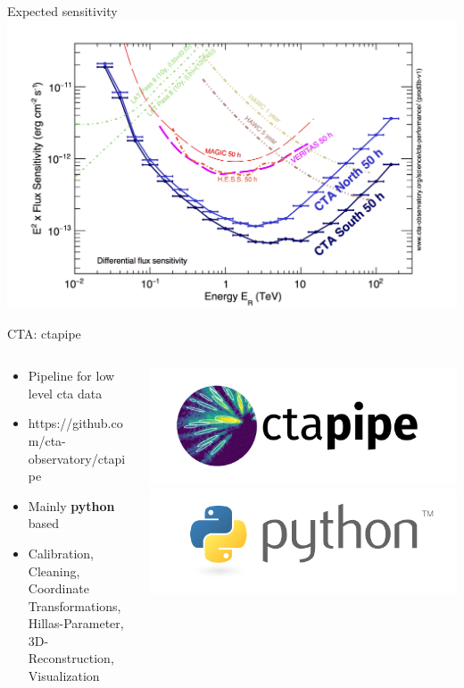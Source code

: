 \begin{frame}{Expected sensitivity \cite{cta_sensitivity}}
\centering
        \includegraphics[width=0.75\linewidth]{images/cta_sensitivity.png}
\end{frame}

\begin{frame}{CTA: ctapipe}
    \begin{columns}[T] %
        \begin{column}{.45\textwidth}
            \vspace{10pt}
            \begin{itemize}
                \item { Pipeline for low level cta data}
                \item { https://github.com/cta-observatory/ctapipe}
                \item { Mainly \textbf{python} based}
                \item { Calibration, Cleaning, Coordinate Transformations, 
                        Hillas-Parameter, 3D-Reconstruction, Visualization}
            \end{itemize}
        \end{column}
        \begin{column}{.48\textwidth}
            \includegraphics[width=\linewidth]{images/ctapipe_logo.png}
            \includegraphics[width=\linewidth]{images/python_logo.png}
        \end{column}
    \end{columns}
\end{frame}
